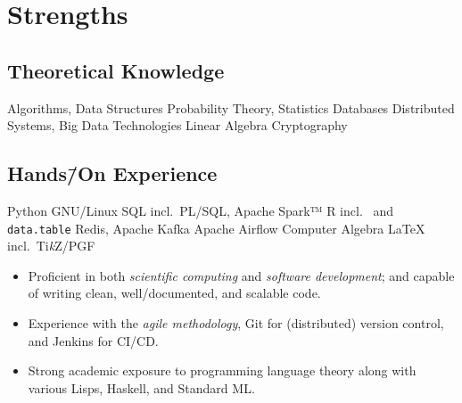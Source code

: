 \documentclass[11pt,letterpaper]{article}%
\begin{document}
\begin{minipage}[t]{.4\textwidth}
  \section{Strengths}%
  \label{sec:strengths}
  \subsection{Theoretical Knowledge}%
  \label{sec:theoretical-knowledge}
  \begin{tcbitemize}[%
    raster columns=2,%
    raster equal height=rows,%
    size=fbox,%
    halign=flush left,%
    valign=center,%
    on line,%
    rounded corners,%
    colframe=black%
    ]
    \tcbitem{}Algorithms, Data Structures%
    \tcbitem{}Probability Theory, Statistics%
    \tcbitem{}Databases%
    \tcbitem{}Distributed Systems, Big Data Technologies%
    \tcbitem{}Linear Algebra%
    \tcbitem{}Cryptography
  \end{tcbitemize}

  \subsection{%
    \texorpdfstring%
    {Hands\=/On Experience}%
    {Hands-On Experience}%
  }%
  \label{sec:hands-on-experience}
  \begin{tcbitemize}[%
    raster columns=2,%
    raster equal height=rows,%
    size=fbox,%
    halign=flush left,%
    valign=center,%
    on line,%
    rounded corners,%
    colframe=black%
    ]
    \tcbitem{}Python%
    \tcbitem{}GNU/Linux%
    \tcbitem{}SQL incl.\ PL/SQL, Apache Spark™%
    \tcbitem{}R incl.\  and \texttt{data.table}%
    \tcbitem{}Redis, Apache Kafka%
    \tcbitem{}Apache Airflow%
    \tcbitem{}Computer Algebra%
    \tcbitem{}\LaTeX{} incl.\ Ti\emph{k}Z/PGF
  \end{tcbitemize}

  \begingroup%
  \small%
  \begin{itemize}[nosep,leftmargin=*]
  \item Proficient in both \emph{scientific computing} and \emph{software
      development}; and capable of writing clean, well\-/documented, and
    scalable code.
  \item Experience with the \emph{agile methodology}, Git for (distributed)
    version control, and Jenkins for CI/CD\@.
  \item Strong academic exposure to programming language theory along with
    various Lisps, Haskell, and Standard ML\@.
  \end{itemize}
  \endgroup


\end{minipage}
\end{document}
